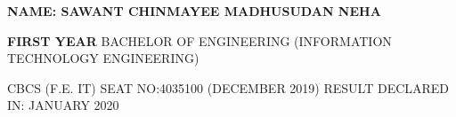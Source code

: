 \documentclass{article} %
\begin{document}
\noindent 

\noindent 

\noindent 

\noindent 

\noindent 

\noindent 

\noindent 

\noindent 

\noindent 

\noindent 

\noindent 

\noindent 

\noindent 

\noindent 

\noindent 

\noindent 

\noindent 

\noindent 

\noindent 

\noindent 

\noindent 

\noindent 

\noindent \textbf{\underbar{}}

\noindent \textbf{}

\noindent 

\noindent \textbf{NAME: SAWANT CHINMAYEE MADHUSUDAN NEHA}

\noindent 

\noindent \textbf{FIRST YEAR} BACHELOR OF ENGINEERING (INFORMATION TECHNOLOGY ENGINEERING)

\noindent 

\noindent \textbf{}  CBCS (F.E. IT)             SEAT NO:4035100 (DECEMBER 2019)     RESULT DECLARED IN: JANUARY 2020

\noindent 

\noindent 
\end{document}
